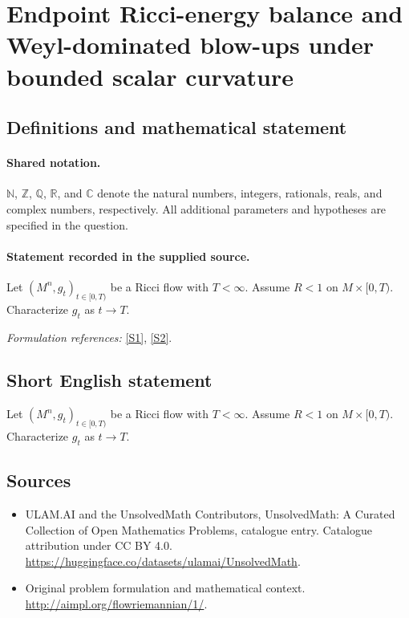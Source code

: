 \documentclass[11pt]{article}
\newcommand{\sref}[2]{\hyperlink{source:#1:#2}{[S#2]}}
\begin{document}
\section{Endpoint Ricci-energy balance and Weyl-dominated blow-ups under bounded scalar curvature}\label{statement}

\subsection{Definitions and mathematical statement}

\paragraph{Shared notation.}$\mathbb N$, $\mathbb Z$, $\mathbb Q$, $\mathbb R$, and $\mathbb C$ denote the natural numbers, integers, rationals, reals, and complex numbers, respectively. All additional parameters and hypotheses are specified in the question.


\paragraph{Statement recorded in the supplied source.}
Let $(M^n,g_t)_{t\in[0,T)}$ be a Ricci flow with $T<\infty$. Assume $R <1$ on $M\times [0,T)$. Characterize $g_t$ as $t\to T$.
\par\smallskip\textit{Formulation references:} \sref{statement}{1}, \sref{statement}{2}.
\subsection{Short English statement}
Let $(M^n,g_t)_{t\in[0,T)}$ be a Ricci flow with $T<\infty$. Assume $R <1$ on $M\times [0,T)$. Characterize $g_t$ as $t\to T$.
\subsection{Sources}
\begin{itemize}
\item[\hypertarget{source:statement:1}{S1}] ULAM.AI and the UnsolvedMath Contributors, UnsolvedMath: A Curated Collection of Open Mathematics Problems, catalogue entry. Catalogue attribution under CC BY 4.0.
\url{https://huggingface.co/datasets/ulamai/UnsolvedMath}.
\item[\hypertarget{source:statement:2}{S2}] Original problem formulation and mathematical context.
\url{http://aimpl.org/flowriemannian/1/}.
\end{itemize}
\label{end:statement}
\end{document}

